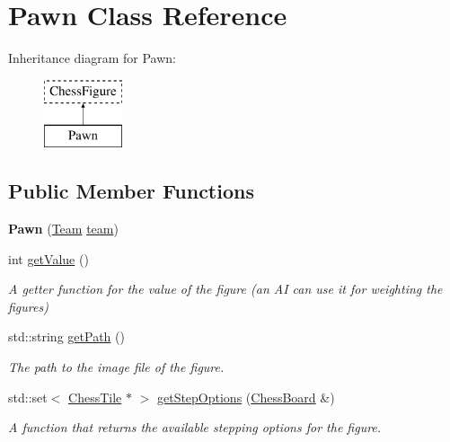 \hypertarget{classPawn}{}\section{Pawn Class Reference}
\label{classPawn}
Inheritance diagram for Pawn\+:\begin{figure}[H]
\begin{center}
\leavevmode
\includegraphics[height=2.000000cm]{classPawn}
\end{center}
\end{figure}
\subsection*{Public Member Functions}
\begin{DoxyCompactItemize}
\item 
\mbox{\label{classPawn_ab800634302e5af17a3d37cfe23f4cf15}} 
{\bfseries Pawn} (\mbox{\hyperlink{classChessFigure_a62f54318c1f28a08e6a6a2707f697a1d}{Team}} \mbox{\hyperlink{classChessFigure_ac7d0751a28c94d49927b9524390d1261}{team}})
\item 
\mbox{\label{classPawn_ab8d4325ff14660b70455c7b7acee221c}} 
int \mbox{\hyperlink{classPawn_ab8d4325ff14660b70455c7b7acee221c}{get\+Value}} ()
\begin{DoxyCompactList}\small\item\em A getter function for the value of the figure (an AI can use it for weighting the figures) \end{DoxyCompactList}\item 
\mbox{\label{classPawn_a72fd4d337ecea0e41f2ffb1933643269}} 
std\+::string \mbox{\hyperlink{classPawn_a72fd4d337ecea0e41f2ffb1933643269}{get\+Path}} ()
\begin{DoxyCompactList}\small\item\em The path to the image file of the figure. \end{DoxyCompactList}\item 
std\+::set$<$ \mbox{\hyperlink{classChessTile}{Chess\+Tile}} $\ast$ $>$ \mbox{\hyperlink{classPawn_aa05272b9dcf50914ca51c5be1fe2d014}{get\+Step\+Options}} (\mbox{\hyperlink{classChessBoard}{Chess\+Board}} \&)
\begin{DoxyCompactList}\small\item\em A function that returns the available stepping options for the figure. \end{DoxyCompactList}\end{DoxyCompactItemize}
